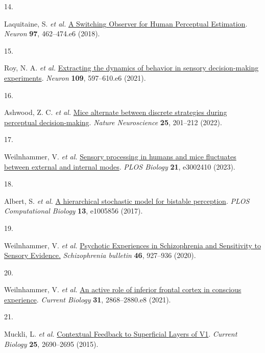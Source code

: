 \documentclass[
]{article}
\newlength{\cslhangindent}
\newlength{\csllabelwidth}
\newlength{\cslentryspacingunit} %
\newenvironment{CSLReferences}[2] %
 {%
  \setlength{\parindent}{0pt}
  \ifodd #1
  \let\oldpar\par
  \def\par{\hangindent=\cslhangindent\oldpar}
  \fi
  \setlength{\parskip}{#2\cslentryspacingunit}
 }%
 {}
\newcommand{\CSLLeftMargin}[1]{\parbox[t]{\csllabelwidth}{#1}}
\newcommand{\CSLRightInline}[1]{\parbox[t]{\linewidth - \csllabelwidth}{#1}\break}
\begin{document}
\begin{CSLReferences}{0}{0}
\leavevmode{}%
\CSLLeftMargin{14. }%
\CSLRightInline{Laquitaine, S. \emph{et al.}
\href{https://doi.org/10.1016/j.neuron.2017.12.011}{A {Switching}
{Observer} for {Human} {Perceptual} {Estimation}}. \emph{Neuron}
\textbf{97}, 462--474.e6 (2018).}

\leavevmode{}%
\CSLLeftMargin{15. }%
\CSLRightInline{Roy, N. A. \emph{et al.}
\href{https://doi.org/10.1016/J.NEURON.2020.12.004}{Extracting the
dynamics of behavior in sensory decision-making experiments}.
\emph{Neuron} \textbf{109}, 597--610.e6 (2021).}

\leavevmode{}%
\CSLLeftMargin{16. }%
\CSLRightInline{Ashwood, Z. C. \emph{et al.}
\href{https://doi.org/10.1038/s41593-021-01007-z}{Mice alternate between
discrete strategies during perceptual decision-making}. \emph{Nature
Neuroscience} \textbf{25}, 201--212 (2022).}

\leavevmode{}%
\CSLLeftMargin{17. }%
\CSLRightInline{Weilnhammer, V. \emph{et al.}
\href{https://doi.org/10.1371/journal.pbio.3002410}{Sensory processing
in humans and mice fluctuates between external and internal modes}.
\emph{PLOS Biology} \textbf{21}, e3002410 (2023).}

\leavevmode{}%
\CSLLeftMargin{18. }%
\CSLRightInline{Albert, S. \emph{et al.}
\href{https://doi.org/10.1371/journal.pcbi.1005856}{A hierarchical
stochastic model for bistable perception}. \emph{PLOS Computational
Biology} \textbf{13}, e1005856 (2017).}

\leavevmode{}%
\CSLLeftMargin{19. }%
\CSLRightInline{Weilnhammer, V. \emph{et al.}
\href{http://www.ncbi.nlm.nih.gov/pubmed/32090246}{Psychotic
{Experiences} in {Schizophrenia} and {Sensitivity} to {Sensory}
{Evidence}.} \emph{Schizophrenia bulletin} \textbf{46}, 927--936
(2020).}

\leavevmode{}%
\CSLLeftMargin{20. }%
\CSLRightInline{Weilnhammer, V. \emph{et al.}
\href{https://doi.org/10.1016/j.cub.2021.04.043}{An active role of
inferior frontal cortex in conscious experience}. \emph{Current Biology}
\textbf{31}, 2868--2880.e8 (2021).}

\leavevmode{}%
\CSLLeftMargin{21. }%
\CSLRightInline{Muckli, L. \emph{et al.}
\href{https://doi.org/10.1016/j.cub.2015.08.057}{Contextual {Feedback}
to {Superficial} {Layers} of {V1}}. \emph{Current Biology} \textbf{25},
2690--2695 (2015).}


\end{CSLReferences}
\end{document}
